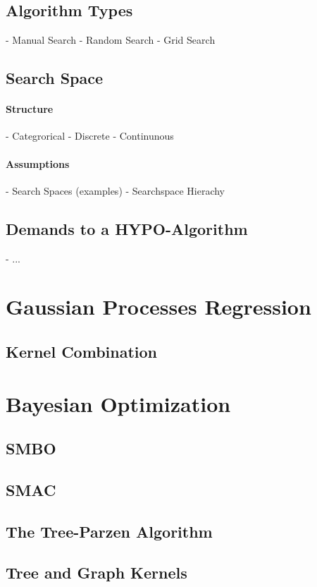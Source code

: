 \documentclass[english]{article}
\begin{document}
\subsection{Algorithm Types}
 - Manual Search
 - Random Search
 - Grid Search

\subsection{Search Space}
\paragraph{Structure}
 - Categrorical
 - Discrete
 - Continunous

\paragraph{Assumptions}
 - Search Spaces (examples)
 - Searchspace Hierachy

\subsection{Demands to a HYPO-Algorithm}
 - ...

\section{Gaussian Processes Regression}
\subsection{Kernel Combination}

\section{Bayesian Optimization}
\subsection{SMBO}
\subsection{SMAC}
\subsection{The Tree-Parzen Algorithm}
\subsection{Tree and Graph Kernels}
\end{document}
